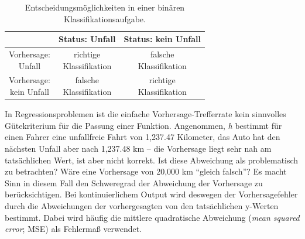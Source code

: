 \begin{table}[h!]
  \centering
  \caption{Entscheidungsmöglichkeiten in einer binären Klassifikationsaufgabe.}

\vspace{0.3cm}
  \def\arraystretch{1.5}%
  \label{tab:svm_table2}
  \begin{tabular}{c|c|c}
     & Status: Unfall & Status: kein Unfall \\

 \hline
    \parbox[t]{2.2cm}{Vorhersage:\\ Unfall\\}
    & \parbox[t]{2.2cm}{richtige\\Klassifikation \\}
    & \parbox[t]{2.2cm}{falsche\\Klassifikation \\} \\

 \hline
    \parbox[t]{2.2cm}{Vorhersage:\\ kein Unfall\\}
    & \parbox[t]{2.2cm}{falsche\\Klassifikation \\}
    & \parbox[t]{2.2cm}{richtige\\Klassifikation \\} \\


  \end{tabular}
\end{table}

\vspace{0.3cm}

In Regressionsproblemen ist die einfache Vorhersage-Trefferrate kein sinnvolles
Gütekriterium für die Passung einer Funktion. Angenommen, \emph{h} bestimmt für einen
Fahrer eine unfallfreie Fahrt von 1,237.47 Kilometer, das Auto hat den nächsten
Unfall aber nach 1,237.48 km -- die Vorhersage liegt sehr nah am tatsächlichen Wert,
ist aber nicht korrekt. Ist diese Abweichung als problematisch zu betrachten?  Wäre
eine Vorhersage von 20,000 km ``gleich falsch''? Es macht Sinn in diesem Fall den
Schweregrad der Abweichung der Vorhersage zu berücksichtigen. Bei kontinuierlichem
Output wird deswegen der Vorhersagefehler durch die Abweichungen der vorhergesagten
von den tatsächlichen y-Werten bestimmt. Dabei wird häufig die mittlere quadratische
Abweichung (\emph{mean squared error}; MSE) als Fehlermaß verwendet.

\vspace{0.3cm}

